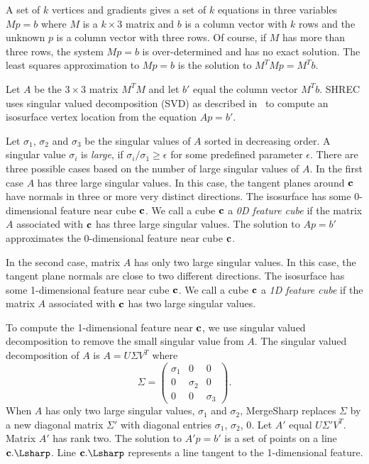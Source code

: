 A set of $k$ vertices and gradients gives a set of $k$ equations 
in three variables $M p = b$
where $M$ is a $k \times 3$ matrix 
and $b$ is a column vector with $k$ rows 
and the unknown $p$ is a column vector with three rows.
Of course, if $M$ has more than three rows,
the system $Mp = b$ is over-determined and has no exact solution.
The least squares approximation to $M p = b$ 
is the solution to $M^T M p = M^T b$.

Let $A$ be the $3 \times 3$ matrix $M^T M$ and 
let $b'$ equal the column vector $M^T b$.
SHREC uses singular valued decomposition (SVD)
as described in~\cite{jlsw-dchd-02,kbsh-fssev-01,l-oslpm-00}
to compute an isosurface vertex location from the equation $A p = b'$.

Let $\sigma_1$, $\sigma_2$ and $\sigma_3$ be the singular values of $A$
sorted in decreasing order.
A singular value $\sigma_i$ is {\em large},
if $\sigma_i/\sigma_1 \ge \epsilon$ for some predefined parameter $\epsilon$.
There are three possible cases based on the number of large singular values
of $A$.
In the first case $A$ has three large singular values.
In this case, the tangent planes around $\mathbf{c}$ have normals in three or more
very distinct directions.
The isosurface has some 0-dimensional feature near cube $\mathbf{c}$.
We call a cube $\mathbf{c}$ a {\em 0D feature cube} if the matrix $A$ associated
with $\mathbf{c}$ has three large singular values.
The solution to $A p = b'$ approximates the 0-dimensional feature 
near cube $\mathbf{c}$.

In the second case, matrix $A$ has only two large singular values.
In this case, 
the tangent plane normals are close to two different directions.
The isosurface has some 1-dimensional feature near cube $\mathbf{c}$.
We call a cube $\mathbf{c}$ a {\em 1D feature cube} if the matrix $A$ associated
with $\mathbf{c}$ has two large singular values.

To compute the 1-dimensional feature near $\mathbf{c}$,
we use singular valued decomposition to remove the small singular value
from $A$.
The singular valued decomposition of $A$ is $A = U \Sigma V^T$
where
\begin{equation*}
\Sigma = \left (
\begin{array}{ccc}
\sigma_1 & 0 & 0 \\
0 & \sigma_2 & 0 \\
0 & 0 & \sigma_3
\end{array}
\right )
.
\end{equation*}
When $A$ has only two large singular values, $\sigma_1$ and $\sigma_2$,
MergeSharp replaces $\Sigma$ by a new diagonal matrix $\Sigma'$
with diagonal entries $\sigma_1$, $\sigma_2$, 0.
Let $A'$ equal $U \Sigma' V^T$.
Matrix $A'$ has rank two.
The solution to $A' p = b'$ is a set of points on a line $\cb.\Lsharp$.
Line $\cb.\Lsharp$ represents a line tangent to the 1-dimensional feature.

